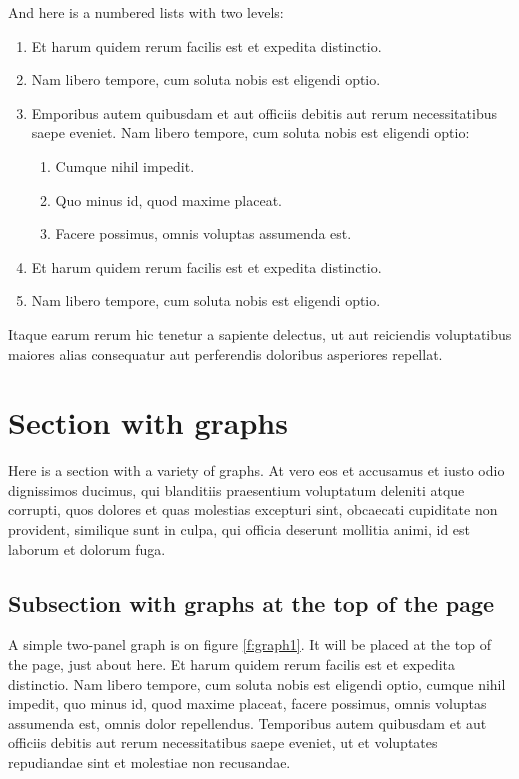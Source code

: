 \documentclass[letterpaper,11pt,leqno]{article}
\begin{document}
And here is a numbered lists with two levels:
\begin{enumerate}
\item Et harum quidem rerum facilis est et expedita distinctio.
\item Nam libero tempore, cum soluta nobis est eligendi optio.
\item Emporibus autem quibusdam et aut officiis debitis aut rerum necessitatibus saepe eveniet. Nam libero tempore, cum soluta nobis est eligendi optio:
\begin{enumerate}
	\item Cumque nihil impedit.
	\item Quo minus id, quod maxime placeat.
	\item Facere possimus, omnis voluptas assumenda est.
\end{enumerate}
\item Et harum quidem rerum facilis est et expedita distinctio.
\item Nam libero tempore, cum soluta nobis est eligendi optio.
\end{enumerate}
Itaque earum rerum hic tenetur a sapiente delectus, ut aut reiciendis voluptatibus maiores alias consequatur aut perferendis doloribus asperiores repellat. 

\section{Section with graphs}\label{s:graphs}

Here is a section with a variety of graphs. At vero eos et accusamus et iusto odio dignissimos ducimus, qui blanditiis praesentium voluptatum deleniti atque corrupti, quos dolores et quas molestias excepturi sint, obcaecati cupiditate non provident, similique sunt in culpa, qui officia deserunt mollitia animi, id est laborum et dolorum fuga. 

\subsection{Subsection with graphs at the top of the page}

A simple two-panel graph is on figure \ref{f:graph1}. It will be placed at the top of the page, just about here. Et harum quidem rerum facilis est et expedita distinctio. Nam libero tempore, cum soluta nobis est eligendi optio, cumque nihil impedit, quo minus id, quod maxime placeat, facere possimus, omnis voluptas assumenda est, omnis dolor repellendus. Temporibus autem quibusdam et aut officiis debitis aut rerum necessitatibus saepe eveniet, ut et voluptates repudiandae sint et molestiae non recusandae.
\end{document}
